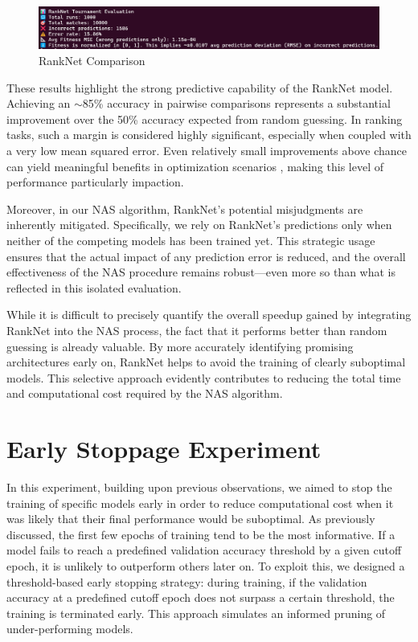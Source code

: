 \begin{figure}[ht]
    \centering
    \includegraphics[width=1.05\linewidth]{Pictures/RankNetComparison.png}
    \caption{RankNet Comparison}
    \label{fig:RankNetComparison}
\end{figure}


These results highlight the strong predictive capability of the RankNet model. Achieving an $\sim$85\% accuracy in pairwise comparisons represents a substantial improvement over the 50\% accuracy expected from random guessing. In ranking tasks, such a margin is considered highly significant, especially when coupled with a very low mean squared error. Even relatively small improvements above chance can yield meaningful benefits in optimization scenarios \cite{freund1999large}, making this level of performance particularly impaction.

Moreover, in our NAS algorithm, RankNet's potential misjudgments are inherently mitigated. Specifically, we rely on RankNet's predictions only when neither of the competing models has been trained yet. This strategic usage ensures that the actual impact of any prediction error is reduced, and the overall effectiveness of the NAS procedure remains robust—even more so than what is reflected in this isolated evaluation.

While it is difficult to precisely quantify the overall speedup gained by integrating RankNet into the NAS process, the fact that it performs better than random guessing is already valuable. By more accurately identifying promising architectures early on, RankNet helps to avoid the training of clearly suboptimal models. This selective approach evidently contributes to reducing the total time and computational cost required by the NAS algorithm.


\section{Early Stoppage Experiment}

In this experiment, building upon previous observations, we aimed to stop the training of specific models early in order to reduce computational cost when it was likely that their final performance would be suboptimal. As previously discussed, the first few epochs of training tend to be the most informative. If a model fails to reach a predefined validation accuracy threshold by a given cutoff epoch, it is unlikely to outperform others later on. To exploit this, we designed a threshold-based early stopping strategy: during training, if the validation accuracy at a predefined cutoff epoch does not surpass a certain threshold, the training is terminated early. This approach simulates an informed pruning of under-performing models.

